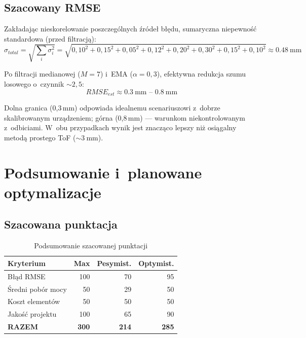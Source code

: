 \documentclass[a4paper,11pt]{article}
\begin{document}
\subsection{Szacowany RMSE}

Zakładając nieskorelowanie poszczególnych źródeł błędu, sumaryczna
niepewność standardowa (przed filtracją):
\begin{equation}
    \sigma_{total} = \sqrt{\sum_i \sigma_i^2}
    = \sqrt{0{,}10^2 + 0{,}15^2 + 0{,}05^2 + 0{,}12^2 + 0{,}20^2 + 0{,}30^2 + 0{,}15^2 + 0{,}10^2}
    \approx \SI{0,48}{\milli\metre}
    \label{eq:sigma_total}
\end{equation}

Po filtracji medianowej ($M = 7$) i~EMA ($\alpha = 0{,}3$), efektywna
redukcja szumu losowego o~czynnik ${\sim}2{,}5$:
\begin{equation}
    \boxed{RMSE_{est} \approx \SI{0,3}{\milli\metre} \text{ -- } \SI{0,8}{\milli\metre}}
    \label{eq:rmse_final}
\end{equation}

Dolna granica (0,3\,mm) odpowiada idealnemu scenariuszowi z~dobrze
skalibrowanym urządzeniem; górna (0,8\,mm) --- warunkom niekontrolowanym
z~odbiciami. W~obu przypadkach wynik jest znacząco lepszy niż osiągalny
metodą prostego ToF (${\sim}\SI{3}{\milli\metre}$).


\section{Podsumowanie i~planowane optymalizacje}
\label{sec:podsumowanie}

\subsection{Szacowana punktacja}

\begin{table}[H]
    \centering
    \caption{Podsumowanie szacowanej punktacji}
    \label{tab:punktacja}
    \begin{tabular}{lrrr}
        \toprule
        \textbf{Kryterium} & \textbf{Max} & \textbf{Pesymist.} & \textbf{Optymist.} \\
        \midrule
        Błąd RMSE         & 100 & 70  & 95 \\
        Średni pobór mocy & 50  & 29  & 50 \\
        Koszt elementów   & 50  & 50  & 50 \\
        Jakość projektu   & 100 & 65  & 90 \\
        \midrule
        \textbf{RAZEM}    & \textbf{300} & \textbf{214} & \textbf{285} \\
        \bottomrule
    \end{tabular}
\end{table}
\end{document}
